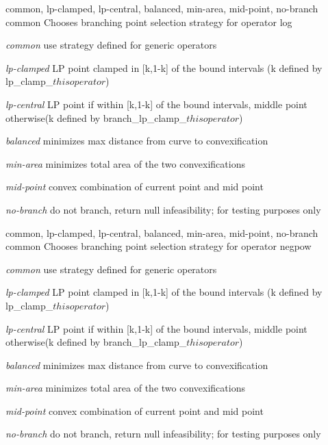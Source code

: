 %
{common, lp-clamped, lp-central, balanced, min-area, mid-point, no-branch}%
{common}%
{Chooses branching point selection strategy for operator log}%
{\begin{list}{}{
\setlength{\parsep}{0em}
\setlength{\leftmargin}{3ex}
\setlength{\labelwidth}{1ex}
\setlength{\itemindent}{0ex}
\setlength{\topsep}{0pt}}
\item[\textit{common}] use strategy defined for generic operators
\item[\textit{lp-clamped}] LP point clamped in [k,1-k] of the bound intervals (k defined by lp\_clamp\_${this operator}$)
\item[\textit{lp-central}] LP point if within [k,1-k] of the bound intervals, middle point otherwise(k defined by branch\_lp\_clamp\_${this operator}$)
\item[\textit{balanced}] minimizes max distance from curve to convexification
\item[\textit{min-area}] minimizes total area of the two convexifications
\item[\textit{mid-point}] convex combination of current point and mid point
\item[\textit{no-branch}] do not branch, return null infeasibility; for testing purposes only
\end{list}
}

%
{common, lp-clamped, lp-central, balanced, min-area, mid-point, no-branch}%
{common}%
{Chooses branching point selection strategy for operator negpow}%
{\begin{list}{}{
\setlength{\parsep}{0em}
\setlength{\leftmargin}{3ex}
\setlength{\labelwidth}{1ex}
\setlength{\itemindent}{0ex}
\setlength{\topsep}{0pt}}
\item[\textit{common}] use strategy defined for generic operators
\item[\textit{lp-clamped}] LP point clamped in [k,1-k] of the bound intervals (k defined by lp\_clamp\_${this operator}$)
\item[\textit{lp-central}] LP point if within [k,1-k] of the bound intervals, middle point otherwise(k defined by branch\_lp\_clamp\_${this operator}$)
\item[\textit{balanced}] minimizes max distance from curve to convexification
\item[\textit{min-area}] minimizes total area of the two convexifications
\item[\textit{mid-point}] convex combination of current point and mid point
\item[\textit{no-branch}] do not branch, return null infeasibility; for testing purposes only
\end{list}
}

